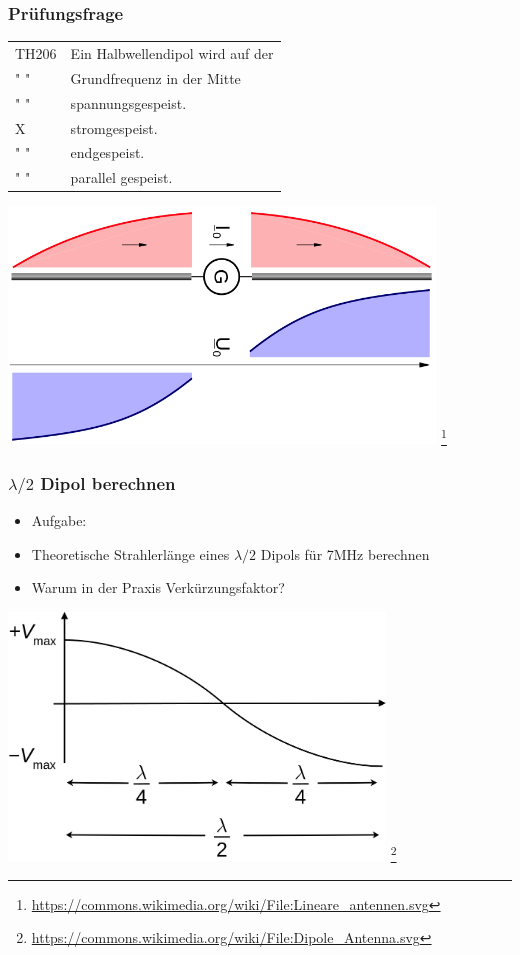 \begin{frame}
    \frametitle{Prüfungsfrage}

    \begin{center}
    \begin{tabular}{l||l}\hline
        TH206 & Ein Halbwellendipol wird auf der  \\
         " "  & Grundfrequenz in der Mitte \\ \hline\hline
         " " & spannungsgespeist.\\\hline
         X & stromgespeist. \\\hline
         " " & endgespeist. \\ \hline
         " " & parallel gespeist.\\\hline
    \end{tabular}
        \includegraphics[width=0.85\textwidth]{e11/DipolUI.png}
        \footnote{\tiny \url{https://commons.wikimedia.org/wiki/File:Lineare_antennen.svg}}
 	\end{center}
\end{frame}
    
\begin{frame}
    \frametitle{$\lambda / 2$ Dipol berechnen}
    \begin{center}
	\begin{itemize}
		\item Aufgabe:
		\item Theoretische Strahlerlänge eines $\lambda / 2$ Dipols für 7MHz berechnen
		\item Warum in der Praxis Verkürzungsfaktor?
    \end{itemize}
        \includegraphics[width=0.75\textwidth]{e11/Dipole_Antenna.png}
        \footnote{\tiny \url{https://commons.wikimedia.org/wiki/File:Dipole_Antenna.svg}}
 	\end{center}
\end{frame}

